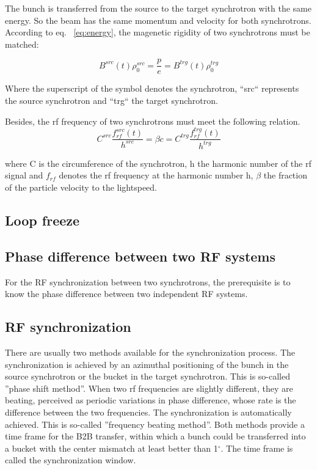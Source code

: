 The bunch is transferred from the source to the target synchrotron with the same energy. So the beam has the same momentum and velocity for both synchrotrons. According to eq. ~\ref{eq:energy}, the magenetic rigidity of two synchrotrons must be matched:

\begin{equation}
	\label{eq:rigidity}
	B^{src}(t)\rho_0^{src} =\frac{p}{e}=B^{trg}(t)\rho_0^{trg}
\end{equation}

Where the superscript of the symbol denotes the synchrotron, ``src`` represents the source synchrotron and ``trg`` the target synchrotron.

Besides, the rf frequency of two synchrotrons must meet the following relation.
\begin{equation}
	\label{eq:velocity}
	C^{src}\frac{f_{rf}^{src}(t)}{h^{src}} = \beta c=C^{trg}\frac{f_{rf}^{trg}(t)}{h^{trg}}
\end{equation}

where C is the circumference of the synchrotron, h the harmonic number of the rf signal and $f_{rf}$ denotes the rf frequency at the harmonic number h, $\beta$  the fraction of the particle velocity to the lightspeed.

\subsection{Loop freeze}


\subsection{Phase difference between two RF systems}

For the RF synchronization between two synchrotrons, the prerequisite is to know the phase difference between two independent RF systems. 
  
\subsection{RF synchronization}

There are usually two methods available for the synchronization process. The synchronization is achieved by an azimuthal positioning of the bunch in the source synchrotron or the bucket in the target synchrotron. This is so-called ''phase shift method''. When two rf frequencies are slightly different, they are beating, perceived as periodic variations in phase difference, whose rate is the difference between the two frequencies. The synchronization is automatically achieved. This is so-called ''frequency beating method''. Both methods provide a time frame for the B2B transfer, within which a bunch could be transferred into a bucket with the center mismatch at least better than 1$^\circ$. The time frame is called the synchronization window. 

